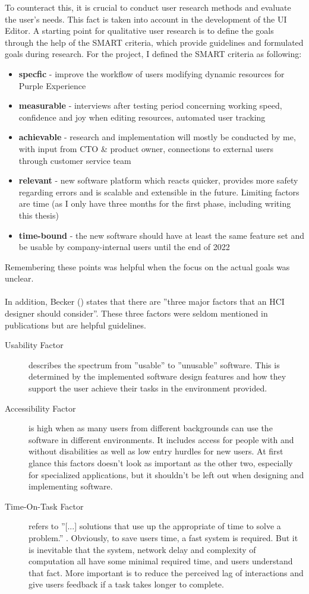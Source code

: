 To counteract this, it is crucial to conduct user research methods and evaluate the user's needs.
This fact is taken into account in the development of the UI Editor.
A starting point for qualitative user research is to define the goals through the help of the SMART criteria, which provide guidelines and formulated goals during research.
For the project, I defined the SMART criteria as following:
\begin{itemize}
  \item \textbf{specfic} - improve the workflow of users modifying dynamic resources for Purple Experience
  \item \textbf{measurable} - interviews after testing period concerning working speed, confidence and joy when editing resources, automated user tracking
  \item \textbf{achievable} - research and implementation will mostly be conducted by me, with input from CTO \& product owner, connections to external users through customer service team
  \item \textbf{relevant} - new software platform which reacts quicker, provides more safety regarding errors and is scalable and extensible in the future. Limiting factors are time (as I only have three months for the first phase, including writing this thesis)
  \item \textbf{time-bound} - the new software should have at least the same feature set and be usable by company-internal users until the end of 2022
\end{itemize}
Remembering these points was helpful when the focus on the actual goals was unclear.
\\\\
In addition, Becker (\cite[pp. 37-41]{LearnHCI:2020ys}) states that there are ''three major factors that an HCI designer should consider''.
These three factors were seldom mentioned in publications but are helpful guidelines.
\begin{description}
  \item[Usability Factor] describes the spectrum from ''usable'' to ''unusable'' software. This is determined by the implemented software design features and how they support the user achieve their tasks in the environment provided.
  \item[Accessibility Factor] is high when as many users from different backgrounds can use the software in different environments. 
  It includes access for people with and without disabilities as well as low entry hurdles for new users.
  At first glance this factors doesn't look as important as the other two, especially for specialized applications, but it shouldn't be left out when designing and implementing software.
  \item[Time-On-Task Factor] refers to ''[...] solutions that use up the appropriate of time to solve a problem.'' \Cite[p. 40]{LearnHCI:2020ys}. Obviously, to save users time, a fast system is required.
But it is inevitable that the system, network delay and complexity of computation all have some minimal required time, and users understand that fact. More important is to reduce the perceived lag of interactions and give users feedback if a task takes longer to complete.
\end{description}

